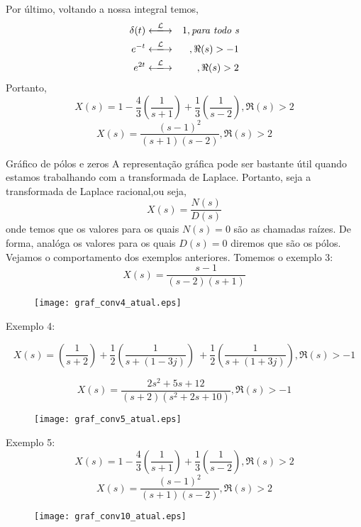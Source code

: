 \documentclass[9pt]{beamer}
\begin{document}
\begin{frame}
  Por \'{u}ltimo, voltando a nossa integral temos, 
  \begin{eqnarray}
    \delta (t) & \xlongleftrightarrow{\mathcal{L}} &  1, \textit{para todo s} \nonumber \\
    e^{-t} & \xlongleftrightarrow{\mathcal{L}} &, \Re(s) > -1 \nonumber \\
    e^{2t} & \xlongleftrightarrow{\mathcal{L}}&, \Re(s) > 2 \nonumber 
  \end{eqnarray}
Portanto, 
$$ X(s) = 1 - \frac {4} {3} \left (\frac {1} {s + 1} \right ) +  \frac {1} {3}  \left (\frac {1} { s - 2} \right), \Re(s) > 2$$
$$X(s) = \frac {(s - 1)^2}{(s + 1)(s -2)}, \Re (s) > 2$$
\end{frame}
\begin{frame}{Gr\'{a}fico de p\'{o}los e zeros}
  A representa\c{c}\~{a}o gr\'{a}fica pode ser  bastante \'{u}til quando estamos trabalhando com  a transformada de Laplace. Portanto, seja a transformada de Laplace racional,ou seja,
  $$X(s) = \frac {N(s)} {D(s)} $$
  onde temos que os valores para os quais $ N(s) = 0 $ s\~{a}o as chamadas ra\'{i}zes. De forma, anal\'{o}ga os valores para os quais $ D(s) = 0$ diremos que s\~{a}o os p\'{o}los. 
  Vejamos o comportamento dos exemplos anteriores. Tomemos o exemplo 3:
  $$X(s)= \frac {s -1} {(s -2) (s + 1)} $$
  \begin{figure}[!htb]
    \texttt{[image: graf\_conv4\_atual.eps]}
  \end{figure}
\end{frame}
\begin{frame}
  Exemplo 4:
  \par
  $$ X(s) \equal \left (\frac {1} {s + 2} \right) +  \frac {1} {2} \left(\frac {1} {s + (1 -3j)} \right) \ + \frac {1} {2} \left (\frac {1} {s + (1 + 3j)} \right) , \Re(s) > -1$$ 
  \par
  $$ X(s) = \frac {2s^{2} + 5s + 12} {(s + 2 ) (s^{2} + 2s + 10)}, \Re (s) > -1 $$
  \begin{figure}[!htpb]
    \texttt{[image: graf\_conv5\_atual.eps]}
  \end{figure}
\end{frame}
\begin{frame}
  Exemplo 5:
$$ X(s) = 1 - \frac {4} {3} \left (\frac {1} {s + 1} \right ) +  \frac {1} {3}  \left (\frac {1} { s - 2} \right), \Re(s) > 2$$
$$X(s) = \frac {(s - 1)^2}{(s + 1)(s -2)}, \Re (s) > 2$$
  \par
  \begin{figure}[!htb]
    \texttt{[image: graf\_conv10\_atual.eps]}
  \end{figure}
\end{frame}
\end{document}
